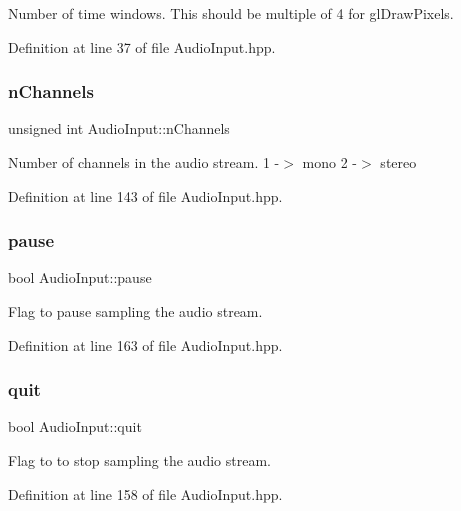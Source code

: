 Number of time windows. This should be multiple of 4 for gl\+Draw\+Pixels. 

Definition at line 37 of file Audio\+Input.\+hpp.

\mbox{\label{classAudioInput_a364801e7fa59b6c8ed881262b2085d42}} 
\subsubsection{\texorpdfstring{n\+Channels}{nChannels}}
{\footnotesize\ttfamily unsigned int Audio\+Input\+::n\+Channels\hspace{0.3cm}{\ttfamily [protected]}}

Number of channels in the audio stream. 1 -\/$>$ mono 2 -\/$>$ stereo 

Definition at line 143 of file Audio\+Input.\+hpp.

\mbox{\label{classAudioInput_a3ff41f73529f77872f6ab585d7cf706a}} 
\subsubsection{\texorpdfstring{pause}{pause}}
{\footnotesize\ttfamily bool Audio\+Input\+::pause\hspace{0.3cm}{\ttfamily [protected]}}

Flag to pause sampling the audio stream. 

Definition at line 163 of file Audio\+Input.\+hpp.

\mbox{\label{classAudioInput_aceef1c12e4f78624ed695371adf495df}} 
\subsubsection{\texorpdfstring{quit}{quit}}
{\footnotesize\ttfamily bool Audio\+Input\+::quit\hspace{0.3cm}{\ttfamily [protected]}}

Flag to to stop sampling the audio stream. 

Definition at line 158 of file Audio\+Input.\+hpp.

